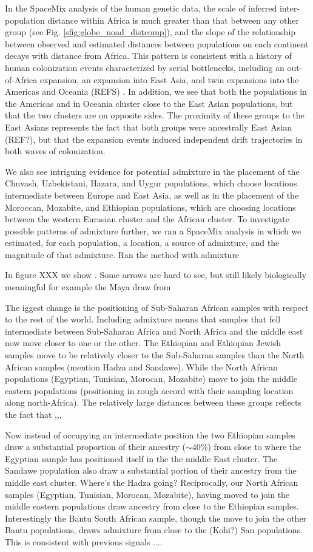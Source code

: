 \documentclass[12pt]{article}
\begin{document}
In the SpaceMix analysis of the human genetic data, the scale of inferred inter-population distance within Africa is much greater than that between any other group (see Fig. \ref{sfig:globe_noad_distcomp}), and the slope of the relationship between observed and estimated distances between populations on each continent decays with distance from Africa.  This pattern is consistent with a history of human colonization events characterized by serial bottlenecks, including an out-of-Africa expansion, an expansion into East Asia, and twin expansions into the Americas and Oceania (REFS) .  In addition, we see that both the populations in the Americas and in Oceania cluster close to the East Asian populations, but that the two clusters are on opposite sides.  The proximity of these groups to the East Asians represents the fact that both groups were ancestrally East Asian (REF?), but that the expansion events induced independent drift trajectories in both waves of colonization.  

We also see intriguing evidence for potential admixture in the placement of the Chuvash, Uzbekistani, Hazara, and Uygur populations, which choose locations intermediate between Europe and East Asia, as well as in the placement of the Moroccan, Mozabite, and Ethiopian populations, which are choosing locations between the western Eurasian cluster and the African cluster.  To investigate possible patterns of admixture further, we ran a SpaceMix analysis in which we estimated, for each population, a location, a source of admixture, and the magnitude of that admixture.
Ran the method with admixture


In figure XXX we show   . Some arrows are hard to see, but still likely biologically meaningful for example the Maya draw from  

The iggest change is the positioning of Sub-Saharan African samples with respect to the rest of the world.  Including admixture means that samples that fell intermediate between  Sub-Saharan Africa and North Africa and the middle east now move closer to one or the other.  The Ethiopian and Ethiopian Jewish samples move to be relatively closer to the Sub-Saharan samples than the North African samples (mention Hadza and Sandawe).  While the North African populations (Egyptian, Tunisian, Morocan, Mozabite) move to join the middle eastern populations (positioning in rough accord with their sampling location along north-Africa). The relatively large distances between these groups reflects the fact that ,,,

Now instead of occupying an intermediate position the two Ethiopian samples draw a substantial proportion of their ancestry ($\sim 40\%$) from close to where the Egyptian sample has positioned itself in the the middle East cluster. The Sandawe population also draw a substantial portion of their ancestry from the middle east cluster.  Where's the Hadza going? Reciprocally, our North African samples (Egyptian, Tunisian, Morocan, Mozabite), having moved to join the middle eastern populations draw ancestry from close to the Ethiopian samples. Interestingly the Bantu South African sample, though the move to join the other Bantu populations, draws admixture from close to the (Kohi?) San populations. This is consistent with previous signals ....
\end{document}

